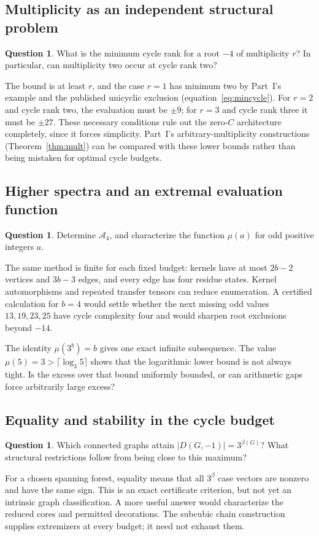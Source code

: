 \documentclass[11pt]{article}
\numberwithin{equation}{section}
\theoremstyle{definition}
\newtheorem{question}[theorem]{Question}
\begin{document}
\subsection{Multiplicity as an independent structural problem}
\begin{question}\label{cb:q:mult}
What is the minimum cycle rank for a root $-4$ of multiplicity $r$?
In particular, can multiplicity two occur at cycle rank two?
\end{question}
The bound is at least $r$, and the case $r=1$ has minimum two by
Part~I's example and the published unicyclic exclusion
(equation~\eqref{eq:mincycle}). For $r=2$ and
cycle rank two, the evaluation must be $\pm9$; for $r=3$ and cycle rank
three it must be $\pm27$. These necessary conditions rule out the
zero-$C$ architecture completely, since it forces simplicity. Part~I's
arbitrary-multiplicity constructions (Theorem~\ref{thm:mult}) can be compared with
these lower bounds rather than being mistaken for optimal cycle budgets.

\subsection{Higher spectra and an extremal evaluation function}
\begin{question}\label{cb:q:spectra}
Determine $\mathcal A_4$, and characterize the function $\mu(a)$ for odd
positive integers $a$.
\end{question}
The same method is finite for each fixed budget: kernels have at most
$2b-2$ vertices and $3b-3$ edges, and every edge has four residue states.
Kernel automorphisms and repeated transfer tensors can reduce enumeration.
A certified calculation for $b=4$ would settle whether the next missing
odd values $13,19,23,25$ have cycle complexity four and would sharpen
root exclusions beyond $-14$.

The identity $\mu(3^b)=b$ gives one exact infinite subsequence. The value
$\mu(5)=3>\lceil\log_3 5\rceil$ shows that the logarithmic lower bound
is not always tight. Is the excess over that bound uniformly bounded,
or can arithmetic gaps force arbitrarily large excess?

\subsection{Equality and stability in the cycle budget}
\begin{question}\label{cb:q:equality}
Which connected graphs attain $|D(G,-1)|=3^{\beta(G)}$? What structural
restrictions follow from being close to this maximum?
\end{question}
For a chosen spanning forest, equality means that all $3^\beta$ case
vectors are nonzero and have the same sign. This is an exact certificate
criterion, but not yet an intrinsic graph classification. A more useful
answer would characterize the reduced cores and permitted decorations.
The subcubic chain construction supplies extremizers at every budget;
it need not exhaust them.
\end{document}
